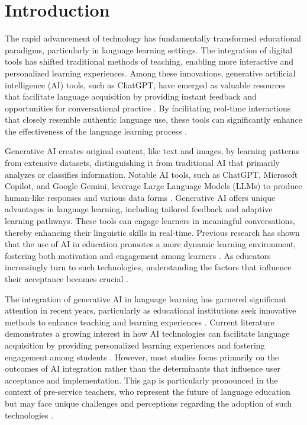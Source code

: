 \documentclass[english]{textolivre}
\begin{document}
\section{Introduction}\label{sec-intro}
The rapid advancement of technology has fundamentally transformed educational paradigms, particularly in language learning settings. The integration of digital tools has shifted traditional methods of teaching, enabling more interactive and personalized learning experiences. Among these innovations, generative artificial intelligence (AI) tools, such as ChatGPT, have emerged as valuable resources that facilitate language acquisition by providing instant feedback and opportunities for conversational practice \cite{GuettalaEtAl2024GenerativeAIEducation}. By facilitating real-time interactions that closely resemble authentic language use, these tools can significantly enhance the effectiveness of the language learning process \cite{HuangPengTeo2025AIAffordances,NagyEtAl2024AIHigherEducation}.

Generative AI creates original content, like text and images, by learning patterns from extensive datasets, distinguishing it from traditional AI that primarily analyzes or classifies information. Notable AI tools, such as ChatGPT, Microsoft Copilot, and Google Gemini, leverage Large Language Models (LLMs) to produce human-like responses and various data forms \cite{CromptonBurke2023AIHigherEducation}. Generative AI offers unique advantages in language learning, including tailored feedback and adaptive learning pathways. These tools can engage learners in meaningful conversations, thereby enhancing their linguistic skills in real-time. Previous research has shown that the use of AI in education promotes a more dynamic learning environment, fostering both motivation and engagement among learners \cite{VyVinh2025ChatGPTListening}. As educators increasingly turn to such technologies, understanding the factors that influence their acceptance becomes crucial \cite{LiuMa2024ChatGPTTAM}.

The integration of generative AI in language learning has garnered significant attention in recent years, particularly as educational institutions seek innovative methods to enhance teaching and learning experiences \cite{MoorhouseEtAl2024GenAICompetence}. Current literature demonstrates a growing interest in how AI technologies can facilitate language acquisition by providing personalized learning experiences and fostering engagement among students \cite{LeeDavisLee2024AIWriting,ZhaiWibowo2023AISystematicReview}. However, most studies focus primarily on the outcomes of AI integration rather than the determinants that influence user acceptance and implementation. This gap is particularly pronounced in the context of pre-service teachers, who represent the future of language education but may face unique challenges and perceptions regarding the adoption of such technologies \cite{Pinninti2025ChatGPTAcademicWriting}.
\end{document}
